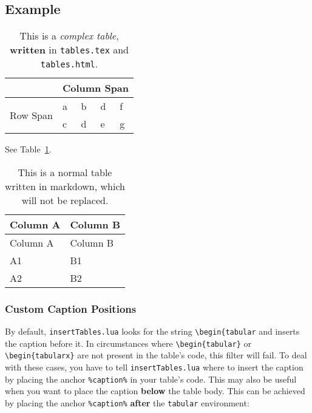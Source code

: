 \documentclass[
]{article}
\begin{document}
\hypertarget{example}{%
\subsection{Example}\label{example}}

\begin{table}[]
    \centering
    \caption{\label{tbl:custom-table}This is a \emph{complex table}, \textbf{written} in \texttt{tables.tex} and \texttt{tables.html}.}
\begin{tabular}{lllll}
        \hline
        \textbf{} & \multicolumn{4}{l}{Column Span} \\ \hline
        \multirow{2}{*}{Row Span} & a & b & d & f \\
         & c & d & e & g \\ \hline
        \end{tabular}
\end{table}

See Table~\ref{tbl:custom-table}.

\hypertarget{tbl:normal-table}{}
\begin{longtable}[]{@{}ll@{}}
\caption{\label{tbl:normal-table}This is a normal table written in
markdown, which will not be replaced.}\tabularnewline
\toprule
Column A & Column B \\
\midrule
\endfirsthead
\toprule
Column A & Column B \\
\midrule
\endhead
A1 & B1 \\
A2 & B2 \\
\bottomrule
\end{longtable}

\hypertarget{custom-caption-positions}{%
\subsubsection{Custom Caption
Positions}\label{custom-caption-positions}}

By default, \texttt{insertTables.lua} looks for the string
\texttt{\textbackslash{}begin\{tabular} and inserts the caption before
it. In circumstances where \texttt{\textbackslash{}begin\{tabular\}} or
\texttt{\textbackslash{}begin\{tabularx\}} are not present in the
table's code, this filter will fail. To deal with these cases, you have
to tell \texttt{insertTables.lua} where to insert the caption by placing
the anchor \texttt{\%caption\%} in your table's code. This may also be
useful when you want to place the caption \textbf{below} the table body.
This can be achieved by placing the anchor \texttt{\%caption\%}
\textbf{after} the \texttt{tabular} environment:
\end{document}
